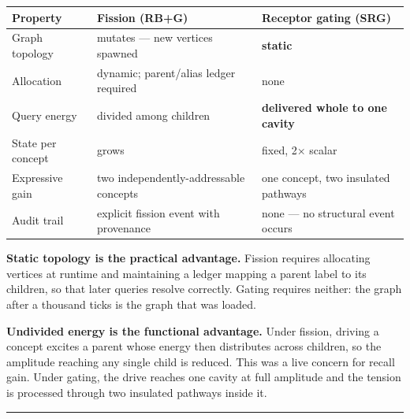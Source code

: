 \documentclass[
  11pt,
  a4paper,
]{article}
\begin{document}
\begin{longtable}[]{@{}
  >{\raggedright\arraybackslash}p{}
  >{\raggedright\arraybackslash}p{}
  >{\raggedright\arraybackslash}p{}@{}}
\toprule\noalign{}
\begin{minipage}[b]{\linewidth}\raggedright
Property
\end{minipage} & \begin{minipage}[b]{\linewidth}\raggedright
Fission (RB+G)
\end{minipage} & \begin{minipage}[b]{\linewidth}\raggedright
Receptor gating (SRG)
\end{minipage} \\
\midrule\noalign{}
\endhead
\bottomrule\noalign{}
\endlastfoot
Graph topology & mutates --- new vertices spawned & \textbf{static} \\
Allocation & dynamic; parent/alias ledger required & none \\
Query energy & divided among children & \textbf{delivered whole to one
cavity} \\
State per concept & grows & fixed, 2× scalar \\
Expressive gain & two independently-addressable concepts & one concept,
two insulated pathways \\
Audit trail & explicit fission event with provenance & none --- no
structural event occurs \\
\end{longtable}

\textbf{Static topology is the practical advantage.} Fission requires
allocating vertices at runtime and maintaining a ledger mapping a parent
label to its children, so that later queries resolve correctly. Gating
requires neither: the graph after a thousand ticks is the graph that was
loaded.

\textbf{Undivided energy is the functional advantage.} Under fission,
driving a concept excites a parent whose energy then distributes across
children, so the amplitude reaching any single child is reduced. This
was a live concern for recall gain. Under gating, the drive reaches one
cavity at full amplitude and the tension is processed through two
insulated pathways inside it.

\begin{center}\rule{0.5\linewidth}{0.5pt}\end{center}
\end{document}
